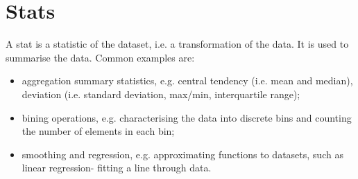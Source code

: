 \documentclass[a4paper, openany]{memoir}
\begin{document}
\section{Stats}
A stat is a statistic of the dataset, i.e. a transformation of the data. It is used to summarise the data. Common examples are:
\begin{itemize}
    \item aggregation summary statistics, e.g. central tendency (i.e. mean and median), deviation (i.e. standard deviation, max/min, interquartile range);
    \item bining operations, e.g. characterising the data into discrete bins and counting the number of elements in each bin;
    \item smoothing and regression, e.g. approximating functions to datasets, such as linear regression- fitting a line through data.
\end{itemize}
\end{document}
